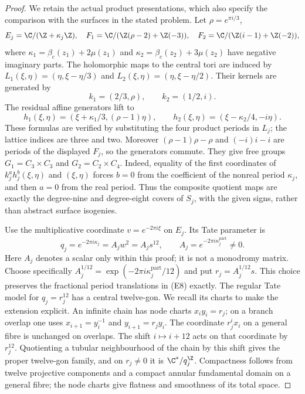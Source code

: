 \begin{proof}
We retain the actual product presentations, which also specify the
comparison with the surfaces in the stated problem. Let
$\rho=e^{\pi i/3}$,
\[
 E_j=\C/(\Z+\kappa_j\Z),\quad
 F_1=\C/(\Z(\rho-2)+\Z(-3)),\quad
 F_2=\C/(\Z(i-1)+\Z(-2)),
\]
where $\kappa_1=\beta_c(z_1)+2\mu(z_1)$ and
$\kappa_2=\beta_c(z_2)+3\mu(z_2)$ have negative imaginary parts.
The holomorphic maps to the central tori are induced by
$L_1(\xi,\eta)=(\eta,\xi-\eta/3)$ and
$L_2(\xi,\eta)=(\eta,\xi-\eta/2)$. Their kernels are generated by
\[
 k_1=(2/3,\rho),\qquad k_2=(1/2,i).
\]
The residual affine generators lift to
\[
 h_1(\xi,\eta)=(\xi+\kappa_1/3,(\rho-1)\eta),\qquad
 h_2(\xi,\eta)=(\xi-\kappa_2/4,-i\eta).                     \tag{E8}
\]
These formulas are verified by substituting the four product periods
in $L_j$; the lattice indices are three and two. Moreover
$(\rho-1)\rho-\rho$ and $(-i)i-i$ are periods of the displayed
$F_j$, so the generators commute. They give free groups
$G_1=C_3\times C_3$ and $G_2=C_2\times C_4$. Indeed, equality of
the first coordinates of $k_j^a h_j^b(\xi,\eta)$ and $(\xi,\eta)$
forces $b=0$ from the coefficient of the nonreal period $\kappa_j$,
and then $a=0$ from the real period. Thus the composite quotient
maps are exactly the degree-nine and degree-eight covers of $S_j$,
with the given signs, rather than abstract surface isogenies.

Use the multiplicative coordinate $v=e^{-2\pi i\xi}$ on $E_j$.
Its Tate parameter is
\[
       q_j=e^{-2\pi i\kappa_j}=A_jw^2=A_js^{12},
       \qquad A_j=e^{-2\pi i\kappa_j^{\mathrm{part}}}\ne0.
\]
Here $A_j$ denotes a scalar only within this proof; it is not a
monodromy matrix. Choose specifically
$A_j^{1/12}=\exp(-2\pi i\kappa_j^{\mathrm{part}}/12)$ and put
$r_j=A_j^{1/12}s$. This choice preserves the fractional period
translations in (E8) exactly. The regular Tate model for $q_j=r_j^{12}$
has a central twelve-gon. We recall its charts to make the extension
explicit. An infinite chain has node charts
$x_i y_i=r_j$; on a branch overlap one uses
$x_{i+1}=y_i^{-1}$ and $y_{i+1}=r_jy_i$. The coordinate
$r_j^i x_i$ on a general fibre is unchanged on overlaps.
The shift $i\mapsto i+12$ acts on that coordinate by $r_j^{12}$.
Quotienting a tubular neighbourhood of the chain by this shift gives
the proper twelve-gon family, and on $r_j\ne0$ it is
$\C^*/q_j^\Z$. Compactness follows from twelve projective components
and a compact annular fundamental domain on a general fibre;
the node charts give flatness and smoothness of its total space.


\end{proof}
